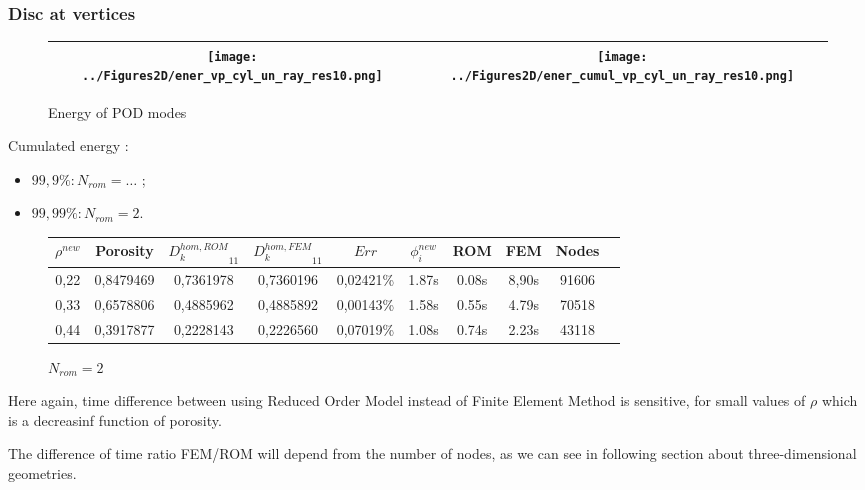 \subsubsection{Disc at vertices}

\begin{figure}[H]
\begin{center}
\begin{tabular}{|c|c|}
\hline
\texttt{[image: ../Figures2D/ener\_vp\_cyl\_un\_ray\_res10.png]}
&%
\texttt{[image: ../Figures2D/ener\_cumul\_vp\_cyl\_un\_ray\_res10.png]}
\\ \hline
\end{tabular}
\end{center}
\caption{Energy of POD modes}
\end{figure}

\begin{multicols}{2}
Cumulated energy :

\columnbreak
\begin{itemize}
\item $99,9 \% : N_{rom}=\dots$ ;
\item $99,99 \% : N_{rom}=2$.
\end{itemize}
%
\end{multicols}

\begin{figure}[H]%
%
\begin{center}
\begin{tabular}{|c|c||c|c||c|c||c|c||c||c|}
\hline
$\rho^{new}$&Porosity&${D_k^{hom,ROM}}_{11}$&${D_k^{hom,FEM}}_{11}$&$Err$&$\phi_i^{new}$&ROM&FEM&Nodes\\
\hline
0,22&0,8479469&0,7361978&0,7360196&0,02421\%&1.87s&0.08s&8,90s&91606\\
\hline
0,33&0,6578806&0,4885962&0,4885892&0,00143\%&1.58s&0.55s&4.79s&70518\\
\hline
0,44&0,3917877&0,2228143&0,2226560&0,07019\%&1.08s&0.74s&2.23s&43118\\
\hline
\end{tabular}
\end{center}
\caption{$N_{rom}=2$}
%
\end{figure}

Here again, time difference between using Reduced Order Model instead of Finite Element Method is sensitive, %
for small values of $\rho$ which is a decreasinf function of porosity.

\par
The difference of time ratio FEM/ROM will depend from the number of nodes, as we can see in following section about three-dimensional geometries. %
 



